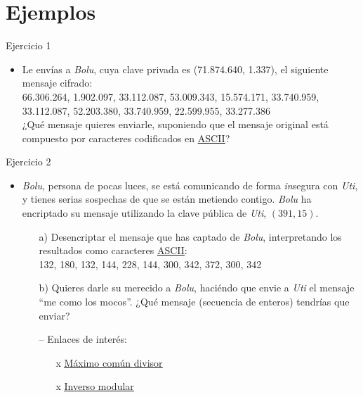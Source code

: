 \documentclass[10pt]{beamer} %
\begin{document}
\section{Ejemplos}
\begin{frame}{Ejercicio 1}
    \begin{itemize}
        \item Le envías a \textit{Bolu}, cuya clave privada es (71.874.640, 1.337), el siguiente mensaje cifrado:\\
        66.306.264,
        1.902.097,
        33.112.087,
        53.009.343,
        15.574.171,
        33.740.959,
        33.112.087,
        52.203.380,
        33.740.959,
        22.599.955,
        33.277.386\\
        ¿Qué mensaje quieres enviarle, suponiendo que el mensaje original está compuesto por caracteres codificados en \href{http://www.asciitable.com/}{\underline{ASCII}}?
    \end{itemize}
\end{frame}
\begin{frame}{Ejercicio 2}
    \begin{itemize}
        \item \textit{Bolu}, persona de pocas luces, se está comunicando de forma \textit{in}segura con \textit{Uti}, y tienes serias sospechas de que se están metiendo contigo. \textit{Bolu} ha encriptado su mensaje utilizando la clave pública de \textit{Uti}, $(391, 15)$.
        \begin{itemize}
            \item[a)] Desencriptar el mensaje que has captado de \textit{Bolu}, interpretando los resultados como caracteres \href{http://www.asciitable.com/}{\underline{ASCII}}: \\
            132, 180, 132, 144, 228, 144, 300, 342, 372, 300, 342
            \item[b)] Quieres darle su merecido a \textit{Bolu}, haciéndo que envie a \textit{Uti} el mensaje ``me como los mocos''. ¿Qué mensaje (secuencia de enteros) tendrías que enviar?
            \item[]
            \item[--] Enlaces de interés:
            \begin{itemize}
                \item[x] \href{http://www.alcula.com/calculators/math/gcd/}{\underline{Máximo común divisor}}
                \item[x] \href{https://planetcalc.com/3311/}{\underline{Inverso modular}}
            \end{itemize}
        \end{itemize}
    \end{itemize}
\end{frame}
\end{document}
